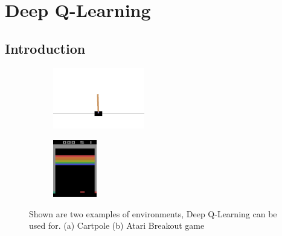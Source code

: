 \section{Deep Q-Learning}

\subsection{Introduction}

\begin{figure}[h]
	\centering
	
	\begin{subfigure}{.3333\textwidth}
		\centering
		\includegraphics[width=4cm]{cartpole.png}
		\caption{}
		\label{fig:cartpole}
    \end{subfigure}%
    \begin{subfigure}{.3333\textwidth}
		\centering
		\includegraphics[height=2.5cm]{breakout.png}
		\caption{}
		\label{fig:cartpole}
	\end{subfigure}%
	
	\caption{Shown are two examples of environments, Deep Q-Learning can be used for. (a) Cartpole (b) Atari Breakout game}
	\label{fig:examples}
\end{figure}


